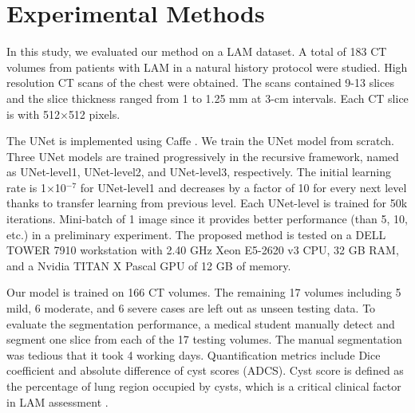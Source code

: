 \documentclass{article}
\begin{document}
\section{Experimental Methods}
In this study, we evaluated our method on a LAM dataset. A total of 183 CT volumes from patients with LAM in a natural history protocol were studied. High resolution CT scans of the chest were obtained. %
The scans contained 9-13 slices and the slice thickness ranged from 1 to 1.25 mm at 3-cm intervals. Each CT slice is with 512$\times$512 pixels.

The UNet is implemented using Caffe \cite{jia2013caffe}. We train the UNet model from scratch. Three UNet models are trained progressively in the recursive framework, named as UNet-level1, UNet-level2, and UNet-level3, respectively. The initial learning rate is 1$\times$10$^{-7}$ for UNet-level1 and decreases by a factor of 10 for every next level thanks to transfer learning from previous level. Each UNet-level is trained for 50k iterations. Mini-batch of 1 image since it provides better performance (than 5, 10, etc.) in a preliminary experiment. The proposed method is tested on a DELL TOWER 7910 workstation with 2.40 GHz Xeon E5-2620 v3 CPU, 32 GB RAM, and a Nvidia TITAN X Pascal GPU of 12 GB of memory.

Our model is trained on 166 CT volumes. The remaining 17 volumes including 5 mild, 6 moderate, and 6 severe cases are left out as unseen testing data. To evaluate the segmentation performance, a medical student manually detect and segment one slice from each of the 17 testing volumes. %
The manual segmentation was tedious that it took 4 working days. Quantification metrics include Dice coefficient and absolute difference of cyst scores (ADCS).
Cyst score is defined as the percentage of lung region occupied by cysts, which is a critical clinical factor in LAM assessment \cite{yao2014sustained}.
\end{document}
